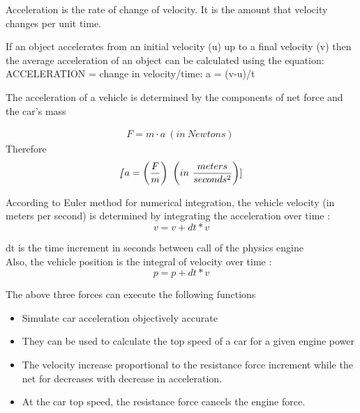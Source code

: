 \documentclass{book}
\begin{document}
Acceleration is the rate of change of velocity. It is the amount that velocity changes per unit time.

If an object accelerates from an initial velocity (u) up to a final velocity (v) then the average acceleration of an object can be calculated using the equation:
ACCELERATION = change in velocity/time: a = (v-u)/t


The acceleration  of a vehicle is determined by the components of net force  and the car's mass 

\begin{eqnarray}\label{eq:2}
F = m \cdot a    \ (in \ Newtons) \
\end{eqnarray}
Therefore
\begin{eqnarray}
\textbf{\textit{[}}{a} = \left(\frac{F}{m}\right)  \  { \left( in \ \frac{meters}{ seconds^2}\right) }]
\end{eqnarray}

According to Euler method for numerical integration, the vehicle velocity (in meters per second) is determined by integrating the acceleration over time :
\begin{equation}
   v =  v + dt * v
\end{equation}

dt is the time increment  in seconds between call of the physics engine \\

Also, the vehicle position is the integral of velocity over time :
 \begin{equation}
   p = p + dt * v
 \end{equation}

 The above three forces can execute the following functions
 \begin{itemize}
     \item Simulate car acceleration objectively accurate
     \item They can be used to calculate the top speed of a car for a given engine power
     \item The velocity increase proportional to the resistance force increment while the net for decreases with decrease in acceleration.
     \item At the car top speed, the resistance force cancels the engine force.
 \end{itemize}
\end{document}
